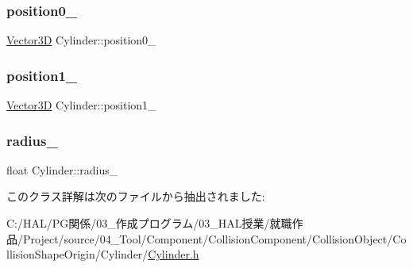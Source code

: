 \subsubsection{\texorpdfstring{position0\+\_\+}{position0\_}}
{\footnotesize\ttfamily \mbox{\hyperlink{class_vector3_d}{Vector3D}} Cylinder\+::position0\+\_\+}

\mbox{\label{class_cylinder_ada317510ac188ea639a0f8613c2b554e}} 
\subsubsection{\texorpdfstring{position1\+\_\+}{position1\_}}
{\footnotesize\ttfamily \mbox{\hyperlink{class_vector3_d}{Vector3D}} Cylinder\+::position1\+\_\+}

\mbox{\label{class_cylinder_abba752e07b11b7bfd8fcce64a6d9b678}} 
\subsubsection{\texorpdfstring{radius\+\_\+}{radius\_}}
{\footnotesize\ttfamily float Cylinder\+::radius\+\_\+}



このクラス詳解は次のファイルから抽出されました\+:\begin{DoxyCompactItemize}
\item 
C\+:/\+H\+A\+L/\+P\+G関係/03\+\_\+作成プログラム/03\+\_\+\+H\+A\+L授業/就職作品/\+Project/source/04\+\_\+\+Tool/\+Component/\+Collision\+Component/\+Collision\+Object/\+Collision\+Shape\+Origin/\+Cylinder/\mbox{\hyperlink{_cylinder_8h}{Cylinder.\+h}}\end{DoxyCompactItemize}
